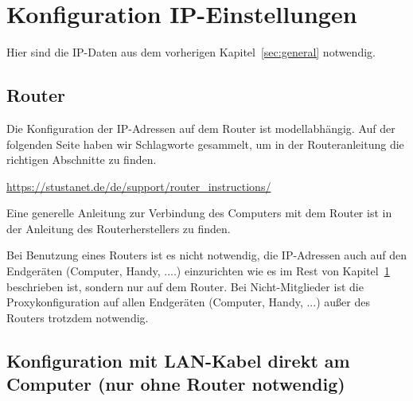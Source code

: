 \documentclass[a4paper,12pt]{scrartcl}
\begin{document}
\newpage

\section{Konfiguration IP-Einstellungen}
\label{sec:network_address}
Hier sind die IP-Daten aus dem vorherigen Kapitel~\ref{sec:general} notwendig.
\subsection{Router}
Die Konfiguration der IP-Adressen auf dem Router ist modellabhängig.
Auf der folgenden Seite haben wir Schlagworte gesammelt, um in der Routeranleitung die richtigen Abschnitte zu finden.

\url{https://stustanet.de/de/support/router_instructions/}

Eine generelle Anleitung zur Verbindung des Computers mit dem Router ist in der Anleitung des Routerherstellers zu finden.

Bei Benutzung eines Routers ist es nicht notwendig, die IP-Adressen auch auf den Endgeräten (Computer, Handy, ....) einzurichten wie es im Rest von Kapitel~\ref{sec:network_address} beschrieben ist, sondern nur auf dem Router.
Bei Nicht-Mitglieder ist die Proxykonfiguration auf allen Endgeräten (Computer, Handy, ...) außer des Routers trotzdem notwendig.

\subsection{Konfiguration mit LAN-Kabel direkt am Computer (nur ohne Router notwendig)}
\end{document}
